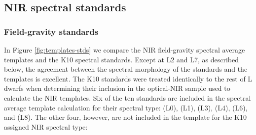 \documentclass[modern,trackchanges]{aastex61}
\begin{document}
\subsection{NIR spectral standards}
\subsubsection{Field-gravity standards}
\label{sec:field_stds}

In Figure \ref{fig:templates-stds} we compare the NIR field-gravity spectral average templates and the K10 spectral standards.
Except at L2 and L7, as described below, the agreement between the spectral morphology of the standards and the templates is excellent. The K10 standards were treated identically to the rest of L dwarfs when determining their inclusion in the optical-NIR sample used to calculate the NIR templates.
Six of the ten standards are included in the spectral average template calculation for their spectral type:  (L0),  (L1),  (L3),  (L4),  (L6), and  (L8).
The other four, however, are not included in the template for the K10 assigned NIR spectral type:
\end{document}
